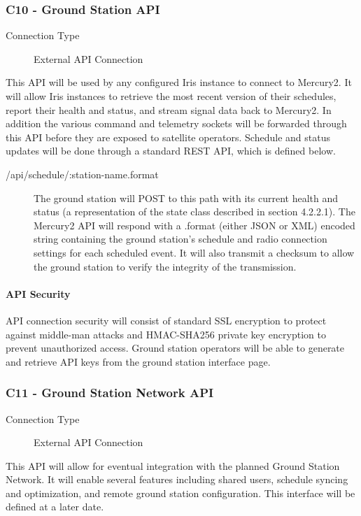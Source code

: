 \documentclass{mxl-note}
\begin{document}
\subsubsection{C10 - Ground Station API}
\begin{description}
	\item [Connection Type] External API Connection
\end{description}
This API will be used by any configured Iris instance to connect to Mercury2. It will allow Iris instances to retrieve the most recent version of their schedules, report their health and status, and stream signal data back to Mercury2. In addition the various command and telemetry sockets will be forwarded through this API before they are exposed to satellite operators. Schedule and status updates will be done through a standard REST API, which is defined below.
\begin{description}
	\item [/api/schedule/:station-name.format] The ground station will POST to this path with its current health and status (a representation of the state class described in section 4.2.2.1). The Mercury2 API will respond with a .format (either JSON or XML) encoded string containing the ground station's schedule and radio connection settings for each scheduled event. It will also transmit a checksum to allow the ground station to verify the integrity of the transmission.
\end{description}

\paragraph{API Security}
API connection security will consist of standard SSL encryption to protect against middle-man attacks and HMAC-SHA256 private key encryption to prevent unauthorized access. Ground station operators will be able to generate and retrieve API keys from the ground station interface page.

\subsubsection{C11 - Ground Station Network API}
\begin{description}
	\item [Connection Type] External API Connection
\end{description}
This API will allow for eventual integration with the planned Ground Station Network. It will enable several features including shared users, schedule syncing and optimization, and remote ground station configuration. This interface will be defined at a later date.
\end{document}
